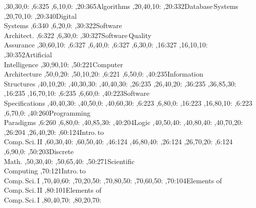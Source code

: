 \documentclass{article}
\begin{document}
\begin{center}
{,30,30,0:
,6:{325}
,6,10,0:
,20:{365}{Algorithms}
,20,40,10:
,20:{332}{Database\,Systems}
,20,70,10:
,20:{340}{Digital\\ Systems}
,6:{340}
,6,20,0:
,30:{322}{Software\\ Architect.}
,6:{322}
,6,30,0:
,30:{327}{Software\,Quality\\ Assurance}
,30,60,10:
,6:{327}
,6,40,0:
,6:{327}
,6,30,0:
,16:{327}
,16,10,10:
,30:{352}{Artificial\\ Intelligence}
,30,90,10:
,50:{221}{Computer\\ Architecture}
,50,0,20:
,50,10,20:
,6:{221}
,6,50,0:
,40:{235}{Information\\ Structures}
,40,10,20:
,40,30,30:
,40,40,30:
,26:{235}
,26,40,20:
,36:{235}
,36,85,30:
,16:{235}
,16,70,10:
,6:{235}
,6,60,0:
,40:{223}{Software\\ Specifications}
,40,40,30:
,40,50,0:
,40,60,30:
,6:{223}
,6,80,0:
,16:{223}
,16,80,10:
,6:{223}
,6,70,0:
,40:{260}{Programming\\ Paradigms}
,6:{260}
,6,80,0:
,40,85,30:
,40:{204}{Logic}
\ctdot
{},40,50,40:
,40,80,40:
\ctsolid
{},40,70,20:
,26:{204}
,26,40,20:
,60:{124}{Intro.\,to\\ Comp.\,Sci.\,II}
,60,30,40:
,60,50,40:
,46:{124}
,46,80,40:
,26:{124}
,26,70,20:
,6:{124}
,6,90,0:
,50:{203}{Discrete\\ Math.}
,50,30,40:
,50,65,40:
,50:{271}{Scientific\\ Computing}
,70:{121}{Intro.\,to\\ Comp.\,Sci.\,I}
,70,40,60:
,70,20,50:
,70,80,50:
\ctdot
{},70,60,50:
\ctsolid
{},70:{104}{Elements of\\ Comp.\,Sci.\,II} 
,80:{101}{Elements of\\ Comp.\,Sci.\,I}
,80,40,70:
,80,20,70:
}
\end{center}
\end{document}
